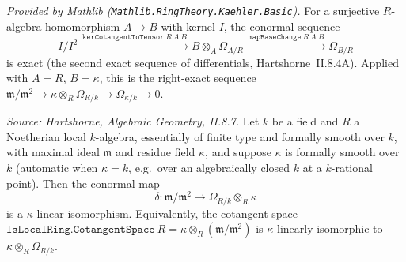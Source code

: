 \begin{lemma}
  \label{lem:exact_kerCotangentToTensor_mapBaseChange_mathlib}
  \mathlibok
  \textit{Provided by Mathlib
  (\texttt{Mathlib.RingTheory.Kaehler.Basic}).}
  For a surjective \(R\)-algebra homomorphism \(A \to B\) with kernel \(I\),
  the conormal sequence
  \[
    I/I^2
      \xrightarrow{\ \texttt{kerCotangentToTensor}\ R\ A\ B\ }
    B \otimes_A \Omega_{A/R}
      \xrightarrow{\ \texttt{mapBaseChange}\ R\ A\ B\ }
    \Omega_{B/R}
  \]
  is exact (the second exact sequence of differentials, Hartshorne~II.8.4A).
  Applied with \(A = R\), \(B = \kappa\), this is the right-exact sequence
  \(\mathfrak m/\mathfrak m^2 \to \kappa \otimes_R \Omega_{R/k} \to
  \Omega_{\kappa/k} \to 0\).
\end{lemma}

\begin{lemma}
  \label{lem:conormal_cotangentSpace_baseChange_kaehler}
  \leanok
  \textit{Source: Hartshorne, Algebraic Geometry, II.8.7.}
  Let \(k\) be a field and \(R\) a Noetherian local \(k\)-algebra,
  essentially of finite type and formally smooth over \(k\), with maximal
  ideal \(\mathfrak m\) and residue field \(\kappa\), and suppose \(\kappa\)
  is formally smooth over \(k\) (automatic when \(\kappa = k\), e.g.\ over an
  algebraically closed \(k\) at a \(k\)-rational point). Then the conormal
  map
  \[
    \delta : \mathfrak m / \mathfrak m^2 \longrightarrow
      \Omega_{R/k} \otimes_R \kappa
  \]
  is a \(\kappa\)-linear isomorphism. Equivalently, the cotangent space
  \(\texttt{IsLocalRing.CotangentSpace}\ R = \kappa \otimes_R
  (\mathfrak m/\mathfrak m^2)\) is \(\kappa\)-linearly isomorphic to
  \(\kappa \otimes_R \Omega_{R/k}\).
\end{lemma}

